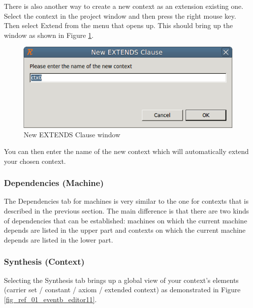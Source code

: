 There is also another way to create a new context as an extension existing one. Select the context in the project window and then press the right mouse key. Then select \textsf{Extend} from the menu that opens up. This should bring up the window as shown in Figure \ref{fig_ref_01_eventb_editor9}.

\begin{figure}[!ht]
\begin{center}
	\includegraphics{img/reference/ref_01_eventb_editor9.png}
	\caption{New EXTENDS Clause window}
	\label{fig_ref_01_eventb_editor9}
\end{center}
\end{figure}

You can then enter the name of the new context which will automatically extend your chosen context. 

\subsubsection{Dependencies (Machine)}

The \textsf{Dependencies} tab for machines is very similar to the one for contexts that is described in the previous section. The main difference is that there are two kinds of dependencies that can be established: machines on which the current machine depends are listed in the upper part and contexts on which the current machine depends are listed in the lower part.

\subsubsection{Synthesis (Context)}

Selecting the \textsf{Synthesis} tab brings up a global view of your context's elements (carrier set / constant / axiom / extended context) as demonstrated in Figure \ref{fig_ref_01_eventb_editor11}. 

